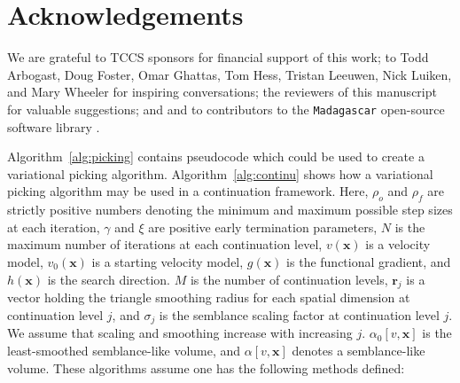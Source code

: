 \section{Acknowledgements}
We are grateful to TCCS sponsors for financial support of this work; to Todd Arbogast, Doug Foster, Omar Ghattas, Tom Hess, Tristan Leeuwen, Nick Luiken, and Mary Wheeler for inspiring conversations; the reviewers of this manuscript for valuable suggestions; and and to contributors to the \texttt{Madagascar} open-source software library \cite[]{madagascar}.

Algorithm~\ref{alg:picking} contains pseudocode which could be used to create a variational picking algorithm.  Algorithm~\ref{alg:continu} shows how a variational picking algorithm may be used in a continuation framework.  Here, $\rho_o$ and $\rho_f$ are strictly positive numbers denoting the minimum and maximum possible step sizes at each iteration, $\gamma$ and $\xi$ are positive early termination parameters, $N$ is the maximum number of iterations at each continuation level, $v(\mathbf{x})$ is a velocity model, $v_0(\mathbf{x})$ is a starting velocity model, $g(\mathbf{x})$ is the functional gradient, and $h(\mathbf{x})$ is the search direction. $M$ is the number of continuation levels,  $\mathbf{r}_j$ is a vector holding the triangle smoothing radius for each spatial dimension at continuation level $j$, and $\sigma_j$ is the semblance scaling factor at continuation level $j$. We assume that scaling and smoothing increase with increasing $j$. $\alpha_0 \left[v,\mathbf{x}\right]$ is the least-smoothed semblance-like volume, and $\alpha \left[v,\mathbf{x}\right]$ denotes a semblance-like volume.  These algorithms assume one has the following methods defined:
